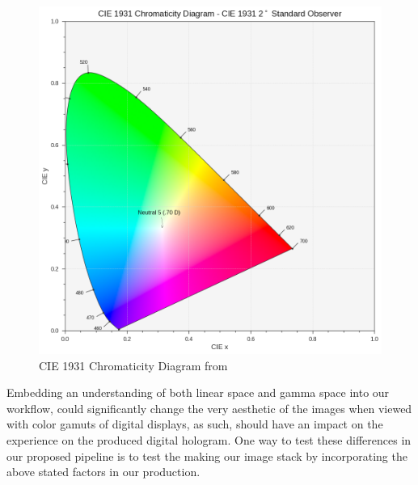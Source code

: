 \begin{figure}[H]
  \centering
  \includegraphics[width=\linewidth]{img/cie.png}
  \caption{CIE 1931 Chromaticity Diagram from \cite{mansencal_thomas_2018_2647615}}
\end{figure}

Embedding an understanding of both linear space and gamma space into our workflow, could significantly change the very aesthetic of the images when viewed with color gamuts of digital displays, as such, should have an impact on the experience on the produced digital hologram.  One way to test these differences in our proposed pipeline is to test the making our image stack by incorporating the above stated factors in our production.

\\